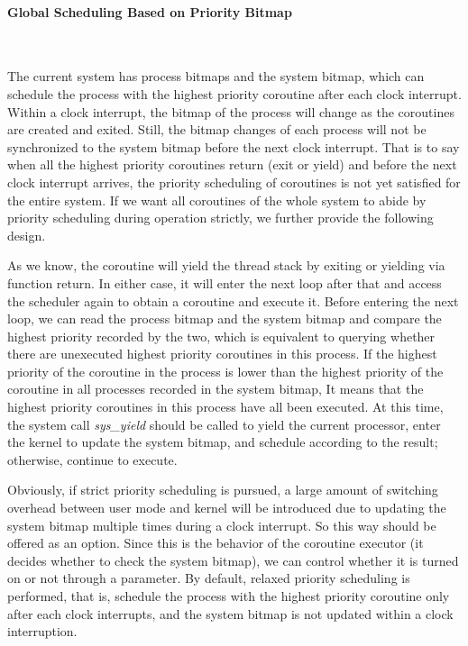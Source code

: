 \documentclass[10pt]{article}
\begin{document}
\paragraph{Global Scheduling Based on Priority Bitmap}~{}

The current system has process bitmaps and the system bitmap, which can schedule the process with the highest priority coroutine after each clock interrupt. Within a clock interrupt, the bitmap of the process will change as the coroutines are created and exited. Still, the bitmap changes of each process will not be synchronized to the system bitmap before the next clock interrupt. That is to say when all the highest priority coroutines return (exit or yield) and before the next clock interrupt arrives, the priority scheduling of coroutines is not yet satisfied for the entire system. If we want all coroutines of the whole system to abide by priority scheduling during operation strictly, we further provide the following design.

As we know, the coroutine will yield the thread stack by exiting or yielding via function return. In either case, it will enter the next loop after that and access the scheduler again to obtain a coroutine and execute it. Before entering the next loop, we can read the process bitmap and the system bitmap and compare the highest priority recorded by the two, which is equivalent to querying whether there are unexecuted highest priority coroutines in this process. If the highest priority of the coroutine in the process is lower than the highest priority of the coroutine in all processes recorded in the system bitmap, It means that the highest priority coroutines in this process have all been executed. At this time, the system call \textit{sys\_yield} should be called to yield the current processor, enter the kernel to update the system bitmap, and schedule according to the result; otherwise, continue to execute.

Obviously, if strict priority scheduling is pursued, a large amount of switching overhead between user mode and kernel will be introduced due to updating the system bitmap multiple times during a clock interrupt. So this way should be offered as an option. Since this is the behavior of the coroutine executor (it decides whether to check the system bitmap), we can control whether it is turned on or not through a parameter. By default, relaxed priority scheduling is performed, that is, schedule the process with the highest priority coroutine only after each clock interrupts, and the system bitmap is not updated within a clock interruption.
\end{document}
